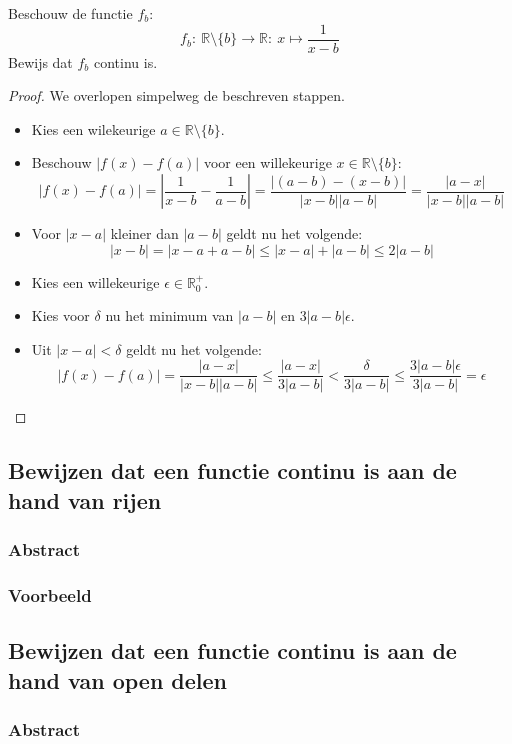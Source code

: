 \documentclass[main.tex]{subfiles}
\begin{document}
Beschouw de functie $f_{b}$:
\[ f_{b}:\ \mathbb{R}\setminus \{ b \} \rightarrow \mathbb{R}:\ x \mapsto \frac{1}{x-b} \]
Bewijs dat $f_{b}$ continu is.

\begin{proof}
  We overlopen simpelweg de beschreven stappen.
  \begin{itemize}
  \item Kies een wilekeurige $a \in \mathbb{R}\setminus \{ b \}$.
  \item Beschouw $|f(x)-f(a)|$ voor een willekeurige $x \in \mathbb{R}\setminus \{ b \}$:
    \[ |f(x)-f(a)| = \left|\frac{1}{x-b} - \frac{1}{a-b}\right| = \frac{|(a-b) - (x-b)|}{|x-b||a-b|} = \frac{|a-x|}{|x-b||a-b|} \]
  \item Voor $|x-a|$ kleiner dan $|a-b|$ geldt nu het volgende:
    \[ |x-b| = |x-a+a-b| \le |x-a|+|a-b| \le 2|a-b| \]
  \item Kies een willekeurige $\epsilon \in \mathbb{R}_{0}^{+}$.
  \item Kies voor $\delta$ nu het minimum van $|a-b|$ en $3|a-b|\epsilon$.
  \item Uit $|x-a| < \delta$ geldt nu het volgende:
    \[ |f(x)-f(a)| = \frac{|a-x|}{|x-b||a-b|} \le \frac{|a-x|}{3|a-b|} < \frac{\delta}{3|a-b|} \le \frac{3|a-b|\epsilon}{3|a-b|} = \epsilon \]
  \end{itemize}
\end{proof}
\feed

\subsection{Bewijzen dat een functie continu is aan de hand van rijen}
\subsubsection{Abstract}
\subsubsection{Voorbeeld}

\subsection{Bewijzen dat een functie continu is aan de hand van open delen}
\subsubsection{Abstract}
\end{document}
